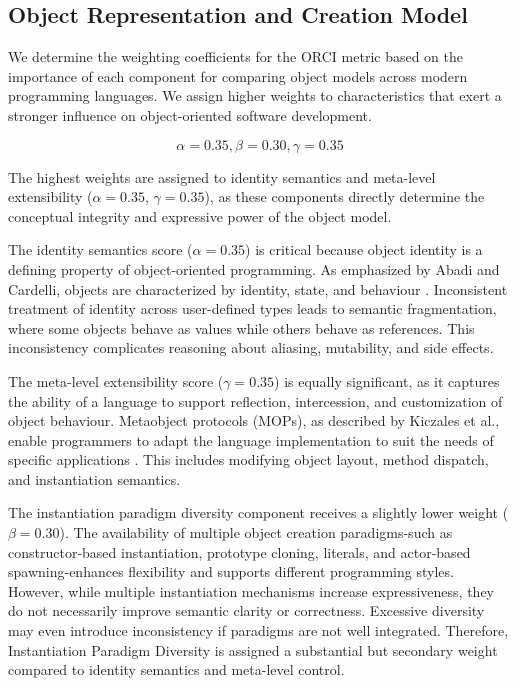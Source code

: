 \subsection{Object Representation and Creation Model}

We determine the weighting coefficients for the ORCI metric based on the importance of each component for comparing object models across modern programming languages. We assign higher weights to characteristics that exert a stronger influence on object-oriented software development.

\[
\alpha = 0.35, \beta = 0.30, \gamma = 0.35
\]

The highest weights are assigned to identity semantics and meta-level extensibility ($\alpha = 0.35$, $\gamma = 0.35$), as these components directly determine the conceptual integrity and expressive power of the object model. 

The identity semantics score ($\alpha = 0.35$) is critical because object identity is a defining property of object-oriented programming. As emphasized by Abadi and Cardelli, objects are characterized by identity, state, and behaviour \cite{abadi2012theory}. Inconsistent treatment of identity across user-defined types leads to semantic fragmentation, where some objects behave as values while others behave as references. This inconsistency complicates reasoning about aliasing, mutability, and side effects.

The meta-level extensibility score ($\gamma = 0.35$) is equally significant, as it captures the ability of a language to support reflection, intercession, and customization of object behaviour. Metaobject protocols (MOPs), as described by Kiczales et al., enable programmers to adapt the language implementation to suit the needs of specific applications \cite{kiczales1991art}. This includes modifying object layout, method dispatch, and instantiation semantics.

The instantiation paradigm diversity component receives a slightly lower weight ($\beta = 0.30$). The availability of multiple object creation paradigms-such as constructor-based instantiation, prototype cloning, literals, and actor-based spawning-enhances flexibility and supports different programming styles. However, while multiple instantiation mechanisms increase expressiveness, they do not necessarily improve semantic clarity or correctness. Excessive diversity may even introduce inconsistency if paradigms are not well integrated. Therefore, Instantiation Paradigm Diversity is assigned a substantial but secondary weight compared to identity semantics and meta-level control.


